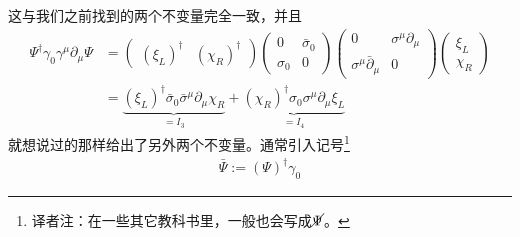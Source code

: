 这与我们之前找到的两个不变量完全一致，并且
\[\begin{split}
\Psi^\dagger\gamma_0\gamma^\mu\partial_\mu\Psi &= \left(\begin{matrix}(\xi_L)^\dagger&(\chi_R)^\dagger\end{matrix}\right)\left(\begin{matrix}0&\bar\sigma_0\\\sigma_0&0\end{matrix}\right)\left(\begin{matrix}0&\sigma^\mu\partial_\mu\\\sigma^\mu\bar\partial_\mu&0\end{matrix}\right)\left(\begin{matrix}\xi_L\\\chi_R\end{matrix}\right)\\
& =\underbrace{(\xi_L)^\dagger\bar\sigma_0\bar\sigma^\mu\partial_\mu\chi_R}_{=I_3}+\underbrace{(\chi_R)^\dagger\sigma_0\sigma^\mu\partial_\mu\xi_L}_{=I_4}
\end{split}\]
就想说过的那样给出了另外两个不变量。通常引入记号\footnote{译者注：在一些其它教科书里，一般也会写成$\cancel{\Psi}$。}
\begin{align}
\label{equ6.15}
\bar\Psi:=(\Psi)^\dagger\gamma_0
\end{align}

